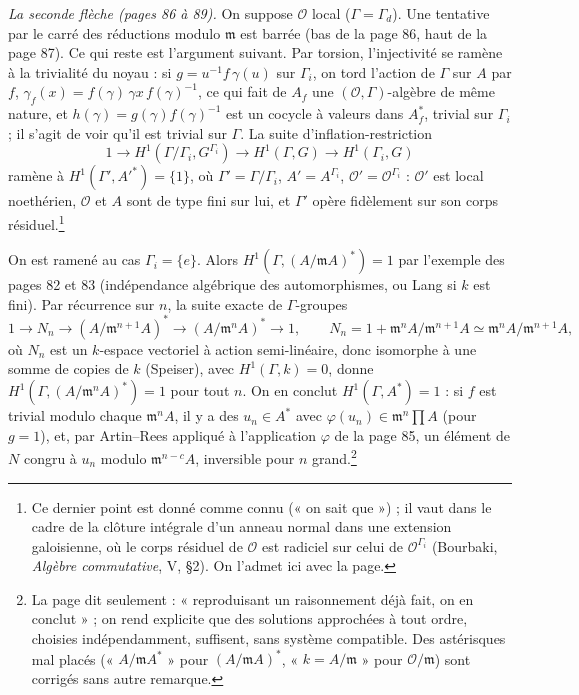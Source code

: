 \documentclass[11pt,a4paper]{article}
\begin{document}
\emph{La seconde flèche (pages 86 à 89).} On suppose $\mathcal{O}$ local
($\Gamma = \Gamma_d$). Une tentative par le carré des réductions modulo
$\mathfrak{m}$ est barrée (bas de la page 86, haut de la page 87). Ce qui
reste est l'argument suivant. Par torsion, l'injectivité se ramène à la
trivialité du noyau : si $g = u^{-1}f\,\gamma(u)$ sur $\Gamma_i$, on tord
l'action de $\Gamma$ sur $A$ par $f$, $\gamma_f(x) = f(\gamma)\,\gamma x\,
f(\gamma)^{-1}$, ce qui fait de $A_f$ une $(\mathcal{O}, \Gamma)$-algèbre de même
nature, et $h(\gamma) = g(\gamma)f(\gamma)^{-1}$ est un cocycle à valeurs dans
$A_f^{*}$, trivial sur $\Gamma_i$ ; il s'agit de voir qu'il est trivial sur
$\Gamma$. La suite d'inflation-restriction
\[
1 \to H^1(\Gamma/\Gamma_i, G^{\Gamma_i}) \to H^1(\Gamma, G) \to H^1(\Gamma_i, G)
\]
ramène à $H^1(\Gamma', A'^{*}) = \lbrace 1\rbrace$, où $\Gamma' = \Gamma/\Gamma_i$, $A'
= A^{\Gamma_i}$, $\mathcal{O}' = \mathcal{O}^{\Gamma_i}$ : $\mathcal{O}'$ est local
noethérien, $\mathcal{O}$ et $A$ sont de type fini sur lui, et $\Gamma'$ opère
fidèlement sur son corps résiduel.\footnote{Ce dernier point est donné comme
connu (« on sait que ») ; il vaut dans le cadre de la clôture intégrale d'un
anneau normal dans une extension galoisienne, où le corps résiduel de
$\mathcal{O}$ est radiciel sur celui de $\mathcal{O}^{\Gamma_i}$ (Bourbaki,
\emph{Algèbre commutative}, V, §2). On l'admet ici avec la page.}

On est ramené au cas $\Gamma_i = \lbrace e\rbrace$. Alors $H^1(\Gamma,
(A/\mathfrak{m}A)^{*}) = 1$ par l'exemple des pages 82 et 83 (indépendance
algébrique des automorphismes, ou Lang si $k$ est fini). Par récurrence sur
$n$, la suite exacte de $\Gamma$-groupes
\[
1 \to N_n \to (A/\mathfrak{m}^{n+1}A)^{*} \to (A/\mathfrak{m}^{n}A)^{*} \to 1,
\qquad N_n = 1 + \mathfrak{m}^{n}A/\mathfrak{m}^{n+1}A \simeq
\mathfrak{m}^{n}A/\mathfrak{m}^{n+1}A,
\]
où $N_n$ est un $k$-espace vectoriel à action semi-linéaire, donc isomorphe à
une somme de copies de $k$ (Speiser), avec $H^1(\Gamma, k) = 0$, donne
$H^1(\Gamma, (A/\mathfrak{m}^{n}A)^{*}) = 1$ pour tout $n$. On en conclut
$H^1(\Gamma, A^{*}) = 1$ : si $f$ est trivial modulo chaque $\mathfrak{m}^{n}A$,
il y a des $u_n \in A^{*}$ avec $\varphi(u_n) \in \mathfrak{m}^{n}\prod A$ (pour
$g = 1$), et, par Artin–Rees appliqué à l'application $\varphi$ de la page 85,
un élément de $N$ congru à $u_n$ modulo $\mathfrak{m}^{n-c}A$, inversible pour
$n$ grand.\footnote{La page dit seulement : « reproduisant un raisonnement
déjà fait, on en conclut » ; on rend explicite que des solutions approchées à
tout ordre, choisies indépendamment, suffisent, sans système compatible. Des
astérisques mal placés (« $A/\mathfrak{m}A^{*}$ » pour
$(A/\mathfrak{m}A)^{*}$, « $k = A/\mathfrak{m}$ » pour
$\mathcal{O}/\mathfrak{m}$) sont corrigés sans autre remarque.}
\end{document}
